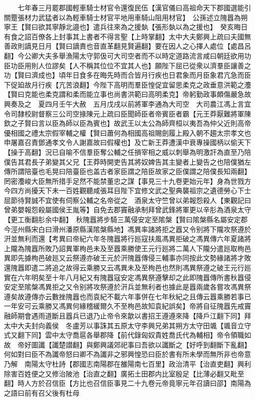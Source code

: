 　　七年春三月罷郡國輕車騎士材官令還復民伍【漢官儀曰高祖命天下郡國選能引關蹷張材力武猛者以為輕車騎士材官平地用車騎山阻用材官】　公孫述立隗囂為朔寧王【賢曰欲其寧靜北邉也】遣兵往來為之援埶【張形埶以為之援也】　癸亥晦日有食之詔百僚各上封事其上書者不得言聖【上時掌翻】太中大夫鄭興上疏曰夫國無善政則謫見日月【賢曰謫責也音直革翻見賢遍翻】要在因人之心擇人處位【處昌呂翻】今公卿大夫多舉漁陽太守郭伋可大司空者而不以時定道路流言咸曰朝廷欲用功臣功臣用則人位謬矣【人不稱其位位不宜其人也】願陛下屈已從衆以濟羣臣讓善之功【賢曰濟成也】頃年日食多在晦先時而合皆月行疾也日君象而月臣象君亢急而臣下促廹故月行疾【亢苦浪翻】今陛下高明而羣臣惶促宜留思柔克之政垂意洪範之灋【賢曰克能也柔克謂和柔而能立事也尚書洪範曰高明柔克】帝躬勤政事頗傷嚴急故興奏及之　夏四月壬午大赦　五月戊戌以前將軍李通為大司空　大司農江馮上言宜令司隸校尉督察三公司空掾陳元上疏曰臣聞師臣者帝賓臣者霸【元王莽厭難將軍陳欽之子賢曰言以臣為師以臣為賓也】故武王以太公為師齊桓以夷吾為仲父近則高帝優相國之禮太宗假宰輔之權【賢曰蕭何為相國高祖賜劍履上殿入朝不趨太宗孝文也申屠嘉召責鄧通孝文令人謝嘉故曰假權也】及亡新王莽遭漢中衰專操國柄以偷天下【操于高翻】況已自喻不信羣臣奪公輔之任損宰相之威以刺舉為明激訐為直至乃陪僕告其君長子弟變其父兄【王莽時開吏告其將奴婢告其主變者上變告之也陪僕猶左傳所謂陪臺也毛晃曰陪臺臣也盖古者家臣謂之陪臣故家之臣僕謂之陪僕長知兩翻】罔密灋峻大臣無所措手足然不能禁董忠之謀【事見三十九卷更始元年】身為世戮方今四方尚擾天下未一百姓觀聽咸張耳目陛下宜修文武之聖典襲祖宗之遺德勞心下士屈節待賢誠不宜使有伺察公輔之名帝從之　酒泉太守竺曾以弟報怨殺人【東觀記曰曾弟嬰報怨殺屬國侯王胤等】自免去郡竇融承制拜曾武鋒將軍更以辛肜為酒泉太守【更工衡翻肜余中翻】　秋隗囂將步騎三萬侵安定至隂槃【賢曰隂槃縣名屬安定郡今涇州縣宋白曰滑州潘原縣漢隂槃縣地】馮異率諸將拒之囂又令别將下隴攻祭遵於汧並無利而還【考異曰帝紀六年冬隗囂將行廵寇扶風馮異拒破之馮異傳六年夏諸將上隴為隗囂所敗乃詔異軍栒邑未及至囂乘勝使王元行廵將二萬人下隴分遣廵取栒邑異即先據栒邑破廵又云祭遵亦破王元於汧隗囂傳侵三輔事亦同按此文勢緣諸將才敗還隗囂即遣二將追之故得云乘勝又云馮異未及至栒邑也然則馮異祭遵之破王元行廵實在六年明矣至十年八月紀又有隗囂寇安定馮異祭遵擊却之此即隗囂傳所書秋囂侵安定至隂槃馮異拒之又令别將攻祭遵於汧兵並無利者也據此是囂兩歲各嘗攻馮異祭遵矣故遵傳亦云數挫隗囂也而袁紀不載六年事併在七年秋紀之且傳云囂乘勝若事已一年安可云乘勝又馮異何緣稽緩爾久不至栒邑故知袁紀誤矣】帝將自征隗囂先戒竇融師期會遇雨道斷且囂兵已退乃止帝令來歙以書招王遵遵來降【降戶江翻下同】拜太中大夫封向義侯　冬盧芳以事誅其五原太守李興兄弟其朔方太守田颯【颯音立守式又翻下同】雲中太守喬扈各舉郡降【前代錄匈奴貴姓喬氏代為輔相】帝令領職如故　帝好圖讖【讖楚譛翻】與鄭興議郊祀事曰吾欲以讖斷之【好呼到翻斷下亂翻】何如對曰臣不為讖帝怒曰卿不為讖非之邪興惶恐曰臣於書有所未學而無所非也帝意乃解　南陽太守杜詩【郡國志南陽郡在雒陽南七百里】政治清平【治直吏翻】興利除害百姓便之又修治陂池【治直之翻】廣拓土田郡内比室殷足【比薄必翻又毗至翻】時人方於召信臣【方比也召信臣事見二十九卷元帝竟寧元年召讀曰邵】南陽為之語曰前有召父後有杜母

